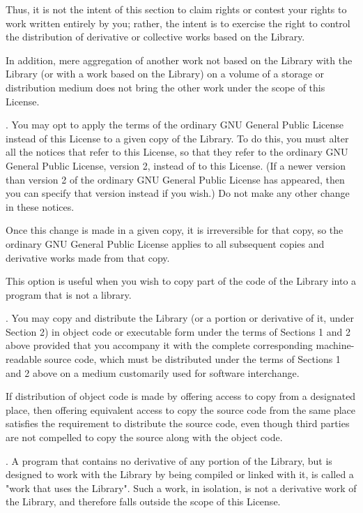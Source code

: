 Thus, it is not the intent of this section to claim rights or contest your rights to work written entirely by you; rather, the intent is to exercise the right to control the distribution of derivative or collective works based on the Library. 

In addition, mere aggregation of another work not based on the Library with the Library (or with a work based on the Library) on a volume of a storage or distribution medium does not bring the other work under the scope of this License. 

. You may opt to apply the terms of the ordinary GNU General Public License instead of this License to a given copy of the Library. To do this, you must alter all the notices that refer to this License, so that they refer to the ordinary GNU General Public License, version 2, instead of to this License. (If a newer version than version 2 of the ordinary GNU General Public License has appeared, then you can specify that version instead if you wish.) Do not make any other change in these notices. 

Once this change is made in a given copy, it is irreversible for that copy, so the ordinary GNU General Public License applies to all subsequent copies and derivative works made from that copy. 

This option is useful when you wish to copy part of the code of the Library into a program that is not a library. 

. You may copy and distribute the Library (or a portion or derivative of it, under Section 2) in object code or executable form under the terms of Sections 1 and 2 above provided that you accompany it with the complete corresponding machine-readable source code, which must be distributed under the terms of Sections 1 and 2 above on a medium customarily used for software interchange. 

If distribution of object code is made by offering access to copy from a designated place, then offering equivalent access to copy the source code from the same place satisfies the requirement to distribute the source code, even though third parties are not compelled to copy the source along with the object code. 

. A program that contains no derivative of any portion of the Library, but is designed to work with the Library by being compiled or linked with it, is called a "work that uses the Library". Such a work, in isolation, is not a derivative work of the Library, and therefore falls outside the scope of this License. 

